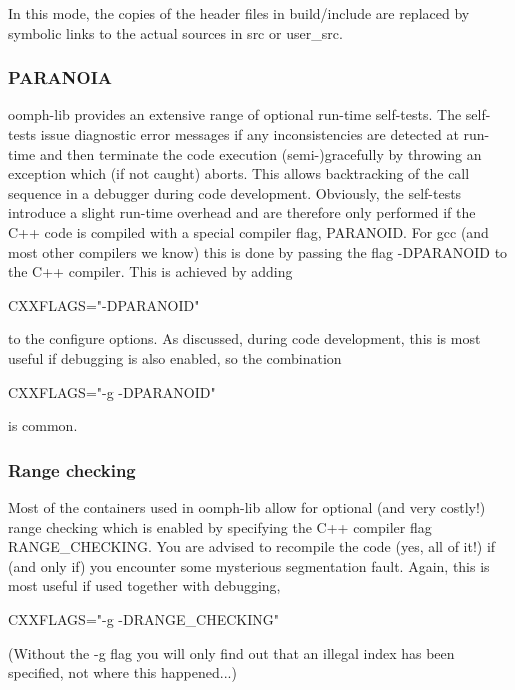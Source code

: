 In this mode, the copies of the header files in {\ttfamily build/include} are replaced by symbolic links to the actual sources in {\ttfamily src} or {\ttfamily user\+\_\+src}.\hypertarget{index_paranoia}{}\subsubsection{P\+A\+R\+A\+N\+O\+IA}\label{index_paranoia}
{\ttfamily oomph-\/lib} provides an extensive range of optional run-\/time self-\/tests. The self-\/tests issue diagnostic error messages if any inconsistencies are detected at run-\/time and then terminate the code execution (semi-\/)gracefully by throwing an exception which (if not caught) aborts. This allows backtracking of the call sequence in a debugger during code development. Obviously, the self-\/tests introduce a slight run-\/time overhead and are therefore only performed if the C++ code is compiled with a special compiler flag, {\ttfamily P\+A\+R\+A\+N\+O\+ID}. For gcc (and most other compilers we know) this is done by passing the flag {\ttfamily -\/\+D\+P\+A\+R\+A\+N\+O\+ID} to the C++ compiler. This is achieved by adding 
\begin{DoxyCode}
CXXFLAGS=\textcolor{stringliteral}{"-DPARANOID"}
\end{DoxyCode}
 to the configure options. As discussed, during code development, this is most useful if debugging is also enabled, so the combination 
\begin{DoxyCode}
CXXFLAGS=\textcolor{stringliteral}{"-g -DPARANOID"}
\end{DoxyCode}
 is common.\hypertarget{index_bounds}{}\subsubsection{Range checking}\label{index_bounds}
Most of the containers used in {\ttfamily oomph-\/lib} allow for optional (and very costly!) range checking which is enabled by specifying the C++ compiler flag {\ttfamily R\+A\+N\+G\+E\+\_\+\+C\+H\+E\+C\+K\+I\+NG}. You are advised to recompile the code (yes, all of it!) if (and only if) you encounter some mysterious segmentation fault. Again, this is most useful if used together with debugging, 
\begin{DoxyCode}
CXXFLAGS=\textcolor{stringliteral}{"-g -DRANGE\_CHECKING"}
\end{DoxyCode}
 (Without the {\ttfamily -\/g} flag you will only find out that an illegal index has been specified, not where this happened...)



